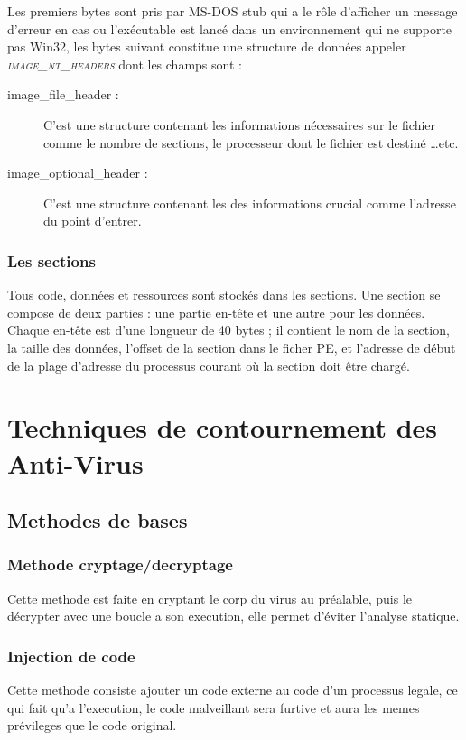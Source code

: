     Les premiers bytes sont pris par MS-DOS stub qui a le rôle d'afficher un message d'erreur en cas ou 
    l'exécutable est lancé dans un environnement qui ne supporte pas Win32, les bytes suivant constitue 
    une structure de données appeler \emph{\textsc{image\_nt\_headers}} dont les champs sont :
    \begin{description}
        \item[image\_file\_header :] C'est une structure contenant les informations nécessaires
            sur le fichier comme le nombre de sections, le processeur dont le fichier est destiné \ldots etc.
        \item[image\_optional\_header :] C'est une structure contenant les des informations crucial comme l'adresse
            du point d'entrer.
    \end{description}

    \subsubsection{Les sections}
    Tous code, données et ressources sont stockés dans les sections. Une section se compose de deux 
    parties : une partie en-tête et une autre pour les données. Chaque en-tête est d'une longueur de 40 
    bytes ; il contient le nom de la section, la taille des données, l'offset de la section dans 
    le ficher PE, et l'adresse de début de la plage d'adresse du processus courant où la section doit être 
    chargé. \cite{pe4}

\section{Techniques de contournement des Anti-Virus}
    \subsection{Methodes de bases}
        \subsubsection{Methode cryptage/decryptage} Cette methode est faite en cryptant le corp du virus au préalable, puis le décrypter avec une boucle a son execution, elle permet d'éviter l'analyse statique.

        \subsubsection{Injection de code} Cette methode consiste ajouter un code externe au code d'un processus legale, ce qui fait qu'a l'execution, le code malveillant sera furtive et aura les memes prévileges que le code original.

